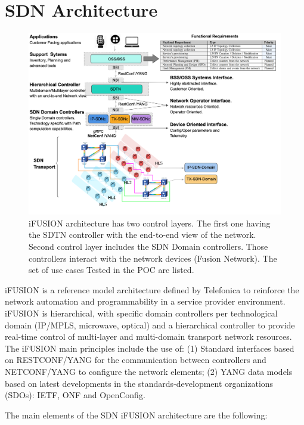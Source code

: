 \documentclass[10pt, conference]{IEEEtran}
\begin{document}
\section{SDN Architecture}
\label{section:arq}
\begin{figure}[htp]
	\centering
	\includegraphics[width=\linewidth]{figs/diagram-1.png}
	\caption{i\uppercase{FUSION}\cite{contreras2019ifusion} architecture has two control layers. The first one having the SDTN controller with the end-to-end view of the network. Second control layer includes the SDN Domain controllers. Those controllers interact with the network devices (Fusion Network). The set of use cases Tested in the POC are listed.}
	\label{FIG:1}
\end{figure}

i\uppercase{FUSION} is a reference model architecture defined by Telefonica to reinforce the network automation and programmability in a service provider environment. i\uppercase{FUSION} is hierarchical, with specific domain controllers per technological domain (IP/MPLS, microwave, optical)
and a hierarchical controller to provide real-time control of multi-layer and multi-domain transport network resources. The i\uppercase{FUSION} main principles include the use of: (1) Standard interfaces based on \uppercase{RESTconf/YANG} \cite{bierman2017restconf} for the communication between controllers and \uppercase{NETCONF/YANG} \cite{enns2011network} to configure the network elements; (2) YANG data models based on latest developments in the standards-development organizations (SDOs): \uppercase{IETF}, \uppercase{ONF} and OpenConfig.


The main elements of the SDN i\uppercase{FUSION} architecture are the following:
\end{document}
